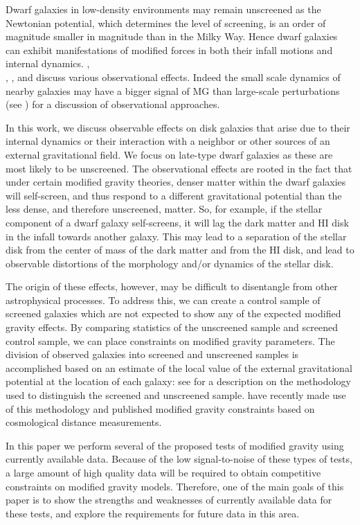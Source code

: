 \documentclass[useAMS,usenatbib,twocolumn]{mn2e}
\begin{document}
Dwarf galaxies in low-density environments may remain unscreened as the 
Newtonian potential, which determines the level of screening, is an order of
magnitude smaller in magnitude than in the Milky Way. Hence dwarf galaxies can
exhibit manifestations of modified forces in both their infall motions and
internal dynamics. \citet{hui09}, \\ \citet{bhuvjake2011}, \citet{changhui}, \citet{hui10}
and \cite{jainvinu2012}
discuss various observational effects. Indeed the small scale dynamics of 
nearby galaxies may have a bigger signal of MG than large-scale perturbations 
(see \citet{jain11}) for a discussion of observational approaches.
 
In this work, we discuss observable effects on disk galaxies that  arise due to 
their internal dynamics or their interaction with a neighbor or other sources of
an external gravitational field. We focus on late-type dwarf galaxies as these
are most likely to be unscreened. The observational effects are rooted in the
fact that under certain modified gravity theories, denser matter within
the dwarf galaxies will self-screen, and thus respond to a different
gravitational potential than the less dense, and therefore unscreened, matter.
So, for example, if the stellar component of a dwarf galaxy self-screens,
it will lag the dark matter and HI disk in the infall towards
another galaxy. This may lead to a separation of the stellar disk from the
center of mass of the dark matter and from the HI disk, and lead to
observable distortions of the morphology and/or dynamics of the stellar disk.

The origin of these effects, however, 
may be difficult to disentangle from other astrophysical
processes. To address this, we can create a control sample of screened galaxies
which are not expected to show any of the expected modified gravity effects.
By comparing statistics of the unscreened sample and screened control
sample, we can place constraints on modified gravity parameters.
The division of observed galaxies into screened and unscreened samples
is accomplished based on an estimate of
the local value of the external gravitational potential at the location
of each galaxy: see \cite{cabre2012} for a description on the methodology
used to distinguish the screened and unscreened sample.
\cite{jainvinu2012} have recently made use of this methodology and
published modified gravity constraints
based on cosmological distance measurements.

In this paper we perform several of the proposed tests of modified gravity
using currently available data. Because of the low signal-to-noise of these
types of tests, a large amount of high quality data will be required to
obtain competitive constraints on modified gravity models.
Therefore, one of the main goals of this paper is to show the strengths and
weaknesses of currently available data for these tests, and explore the
requirements for future data in this area.
\end{document}
